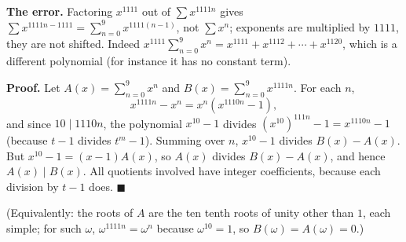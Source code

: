 \textbf{The error.} Factoring $x^{1111}$ out of $\sum x^{1111n}$ gives $\sum x^{1111n-1111}=\sum_{n=0}^{9}x^{1111(n-1)}$, not $\sum x^n$; exponents are multiplied by $1111$, they are not shifted. Indeed $x^{1111}\sum_{n=0}^9x^n=x^{1111}+x^{1112}+\cdots+x^{1120}$, which is a different polynomial (for instance it has no constant term).

\textbf{Proof.} Let $A(x)=\sum_{n=0}^{9}x^n$ and $B(x)=\sum_{n=0}^{9}x^{1111n}$. For each $n$,
\[
x^{1111n}-x^n=x^n\left(x^{1110n}-1\right),
\]
and since $10\mid1110n$, the polynomial $x^{10}-1$ divides $\left(x^{10}\right)^{111n}-1=x^{1110n}-1$ (because $t-1$ divides $t^m-1$). Summing over $n$, $x^{10}-1$ divides $B(x)-A(x)$. But $x^{10}-1=(x-1)A(x)$, so $A(x)$ divides $B(x)-A(x)$, and hence $A(x)\mid B(x)$. All quotients involved have integer coefficients, because each division by $t-1$ does. $\blacksquare$

(Equivalently: the roots of $A$ are the ten tenth roots of unity other than $1$, each simple; for such $\omega$, $\omega^{1111n}=\omega^n$ because $\omega^{10}=1$, so $B(\omega)=A(\omega)=0$.)
